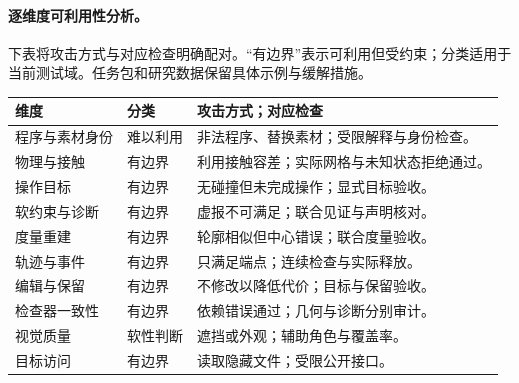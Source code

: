 \paragraph{逐维度可利用性分析。}
下表将攻击方式与对应检查明确配对。“有边界”表示可利用但受约束；分类适用于当前测试域。任务包和研究数据保留具体示例与缓解措施。
\begin{center}\small\begin{tabular}{p{.20\linewidth}p{.17\linewidth}p{.52\linewidth}}\toprule
维度 & 分类 & 攻击方式；对应检查 \\ \midrule
程序与素材身份 & 难以利用 & 非法程序、替换素材；受限解释与身份检查。 \\
物理与接触 & 有边界 & 利用接触容差；实际网格与未知状态拒绝通过。 \\
操作目标 & 有边界 & 无碰撞但未完成操作；显式目标验收。 \\
软约束与诊断 & 有边界 & 虚报不可满足；联合见证与声明核对。 \\
度量重建 & 有边界 & 轮廓相似但中心错误；联合度量验收。 \\
轨迹与事件 & 有边界 & 只满足端点；连续检查与实际释放。 \\
编辑与保留 & 有边界 & 不修改以降低代价；目标与保留验收。 \\
检查器一致性 & 有边界 & 依赖错误通过；几何与诊断分别审计。 \\
视觉质量 & 软性判断 & 遮挡或外观；辅助角色与覆盖率。 \\
目标访问 & 有边界 & 读取隐藏文件；受限公开接口。 \\ \bottomrule
\end{tabular}\end{center}
